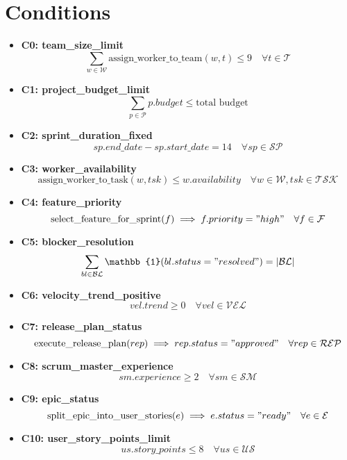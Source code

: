 \documentclass{article}
\begin{document}
\section{Conditions}
\begin{itemize}
    \item \textbf{C0: team\_size\_limit}
    \[
    \sum_{w \in \mathcal{W}} \text{assign\_worker\_to\_team}(w, t) \leq 9 \quad \forall t \in \mathcal{T}
    \]
    \item \textbf{C1: project\_budget\_limit}
    \[
    \sum_{p \in \mathcal{P}} p.budget \leq \text{total budget}
    \]
    \item \textbf{C2: sprint\_duration\_fixed}
    \[
    sp.end\_date - sp.start\_date = 14 \quad \forall sp \in \mathcal{SP}
    \]
    \item \textbf{C3: worker\_availability}
    \[
    \text{assign\_worker\_to\_task}(w, tsk) \leq w.availability \quad \forall w \in \mathcal{W}, tsk \in \mathcal{TSK}
    \]
    \item \textbf{C4: feature\_priority}
    \[
    \text{select\_feature\_for\_sprint}(f) \implies f.priority = "high" \quad \forall f \in \mathcal{F}
    \]
    \item \textbf{C5: blocker\_resolution}
    \[
    \sum_{bl \in \mathcal{BL}} \mathbb{1}(bl.status = "resolved") = |\mathcal{BL}|
    \]
    \item \textbf{C6: velocity\_trend\_positive}
    \[
    vel.trend \geq 0 \quad \forall vel \in \mathcal{VEL}
    \]
    \item \textbf{C7: release\_plan\_status}
    \[
    \text{execute\_release\_plan}(rep) \implies rep.status = "approved" \quad \forall rep \in \mathcal{REP}
    \]
    \item \textbf{C8: scrum\_master\_experience}
    \[
    sm.experience \geq 2 \quad \forall sm \in \mathcal{SM}
    \]
    \item \textbf{C9: epic\_status}
    \[
    \text{split\_epic\_into\_user\_stories}(e) \implies e.status = "ready" \quad \forall e \in \mathcal{E}
    \]
    \item \textbf{C10: user\_story\_points\_limit}
    \[
    us.story\_points \leq 8 \quad \forall us \in \mathcal{US}
    \]
\end{itemize}
\end{document}
